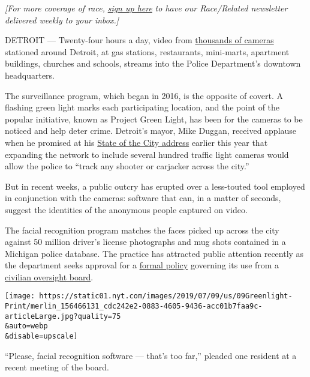 \emph{{[}For more coverage of race,}
\emph{\href{https://www.nytimes.com/2018/10/01/us/subscribe-race-related-newsletter.html?module=inline}{sign
up here}} \emph{to have our Race/Related newsletter delivered weekly to
your inbox.{]}}

DETROIT --- Twenty-four hours a day, video from
\href{https://detroitmi.gov/webapp/project-green-light-map}{thousands of
cameras} stationed around Detroit, at gas stations, restaurants,
mini-marts, apartment buildings, churches and schools, streams into the
Police Department's downtown headquarters.

The surveillance program, which began in 2016, is the opposite of
covert. A flashing green light marks each participating location, and
the point of the popular initiative, known as Project Green Light, has
been for the cameras to be noticed and help deter crime. Detroit's
mayor, Mike Duggan, received applause when he promised at his
\href{https://www.youtube.com/watch?v=dXAZoMCl3qs}{State of the City
address} earlier this year that expanding the network to include several
hundred traffic light cameras would allow the police to ``track any
shooter or carjacker across the city.''

But in recent weeks, a public outcry has erupted over a less-touted tool
employed in conjunction with the cameras: software that can, in a matter
of seconds, suggest the identities of the anonymous people captured on
video.

The facial recognition program matches the faces picked up across the
city against 50 million driver's license photographs and mug shots
contained in a Michigan police database. The practice has attracted
public attention recently as the department seeks approval for a
\href{https://detroitmi.gov/document/facial-recognition}{formal policy}
governing its use from a
\href{https://detroitmi.gov/government/boards/board-police-commissioners}{civilian
oversight board}.

\texttt{[image: https://static01.nyt.com/images/2019/07/09/us/09Greenlight-Print/merlin\_156466131\_cdc242e2-0883-4605-9436-acc01b7faa9c-articleLarge.jpg?quality=75\\\&auto=webp\\\&disable=upscale]}

``Please, facial recognition software --- that's too far,'' pleaded one
resident at a recent meeting of the board.

